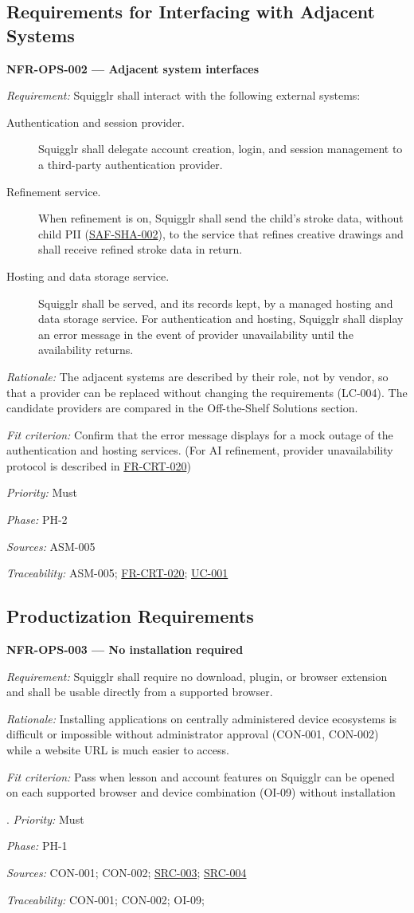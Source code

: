 \documentclass[12pt]{article}
\renewcommand{\_}{\textunderscore\allowbreak}%
\newcommand{\ucref}[1]{\hyperref[uc:#1]{\mbox{UC-#1}}}
\newenvironment{srsrequirement}[2]{%
  \par\medskip\noindent\phantomsection\label{req:#1}%
  \textbf{#1 --- #2}\par\nobreak\smallskip }{\par\medskip}
\newcommand{\reqfield}[2]{\noindent\textit{#1:} #2\par}
\newcommand{\reqshall}[1]{\reqfield{Requirement}{#1}}
\newcommand{\reqrationale}[1]{\reqfield{Rationale}{#1}}
\newcommand{\reqfit}[1]{\reqfield{Fit criterion}{#1}}
\newcommand{\reqpriority}[1]{\reqfield{Priority}{#1}}
\newcommand{\reqphase}[1]{\reqfield{Phase}{#1}}
\newcommand{\reqsources}[1]{\reqfield{Sources}{#1}}
\newcommand{\reqtraces}[1]{\reqfield{Traceability}{#1}}
\newcommand{\reqref}[1]{\hyperref[req:#1]{#1}}
\newcommand{\srcref}[1]{\hyperref[src:#1]{SRC-#1}}
\providecommand{\ucref}[1]{\hyperref[uc:#1]{UC-#1}}
\begin{document}
\subsection{Requirements for Interfacing with Adjacent Systems}

\begin{srsrequirement}{NFR-OPS-002}{Adjacent system interfaces}
  \reqshall{Squigglr shall interact with the following external systems:
\begin{description}
  \item[Authentication and session provider.] Squigglr shall delegate account
  creation, login, and session management to a third-party authentication
  provider.
  \item[Refinement service.] When refinement is on, Squigglr shall send the
  child's stroke data, without child PII (\reqref{SAF-SHA-002}), to the service
    that refines creative drawings and shall receive refined stroke data in
  return.
  \item[Hosting and data storage service.] Squigglr shall be served, and its
  records kept, by a managed hosting and data storage service. For
  authentication and hosting, Squigglr shall display an error message in the
  event of provider unavailability until the availability returns.
  \end{description}} \reqrationale{The adjacent systems are described by their
  role, not by vendor, so that a provider can be replaced without changing the
  requirements (LC-004). The candidate providers are compared in the
  Off-the-Shelf Solutions section.} \reqfit{Confirm that the error message
  displays for a mock outage of the authentication and hosting services. (For AI
  refinement, provider unavailability protocol is described in
  \reqref{FR-CRT-020})}
  \reqpriority{Must}
  \reqphase{PH-2}
  \reqsources{ASM-005}
  \reqtraces{ASM-005; \reqref{FR-CRT-020}; \ucref{001}}
\end{srsrequirement}

\subsection{Productization Requirements}

\begin{srsrequirement}{NFR-OPS-003}{No installation required}
  \reqshall{Squigglr shall require no download, plugin, or browser extension and
  shall be usable directly from a supported browser.} \reqrationale{Installing
  applications on centrally administered device ecosystems is difficult or
  impossible without administrator approval (CON-001, CON-002) while a website
  URL is much easier to access.} \reqfit{Pass when lesson and account features
  on Squigglr can be opened on each supported browser and device combination
  (OI-09) without installation}.
  \reqpriority{Must}
  \reqphase{PH-1}
  \reqsources{CON-001; CON-002; \srcref{003}; \srcref{004}}
  \reqtraces{CON-001; CON-002; OI-09;}
\end{srsrequirement}
\end{document}
